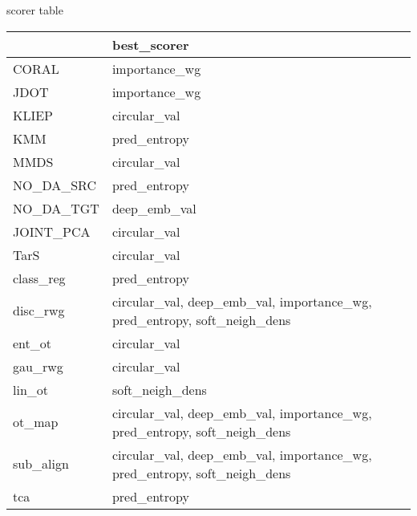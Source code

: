 \subsectionBest scorer table\begin{tabular}{ll}
\hline
           & best\_scorer                                                              \\
\hline
 CORAL     & importance\_wg                                                            \\
 JDOT      & importance\_wg                                                            \\
 KLIEP     & circular\_val                                                             \\
 KMM       & pred\_entropy                                                             \\
 MMDS      & circular\_val                                                             \\
 NO\_DA\_SRC & pred\_entropy                                                             \\
 NO\_DA\_TGT & deep\_emb\_val                                                             \\
 JOINT\_PCA & circular\_val                                                             \\
 TarS      & circular\_val                                                             \\
 class\_reg & pred\_entropy                                                             \\
 disc\_rwg  & circular\_val, deep\_emb\_val, importance\_wg, pred\_entropy, soft\_neigh\_dens \\
 ent\_ot    & circular\_val                                                             \\
 gau\_rwg   & circular\_val                                                             \\
 lin\_ot    & soft\_neigh\_dens                                                          \\
 ot\_map    & circular\_val, deep\_emb\_val, importance\_wg, pred\_entropy, soft\_neigh\_dens \\
 sub\_align & circular\_val, deep\_emb\_val, importance\_wg, pred\_entropy, soft\_neigh\_dens \\
 tca       & pred\_entropy                                                             \\
\hline
\end{tabular}


